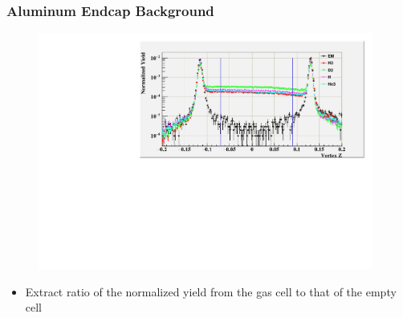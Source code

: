 \documentclass[12pt]{beamer}
\begin{document}
\begin{frame}
\frametitle{Aluminum Endcap Background}
	\vspace{-15pt}
\begin{block}{}
	\begin{figure}
		\includegraphics[width=11.0cm]{../images/endcap_kin4.pdf}
	\end{figure}

\begin{itemize}
	\item Extract ratio of the normalized yield from the gas cell to that of the empty cell
\end{itemize}

\end{block}
\end{frame}
\end{document}
